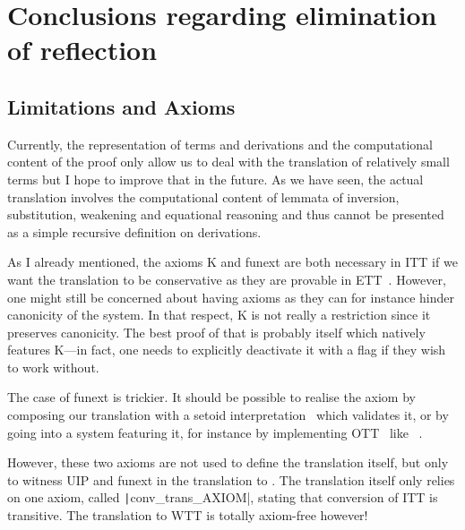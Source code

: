 \chapter{Conclusions regarding elimination of reflection}

\section{Limitations and Axioms}
\label{sec:axioms}

Currently, the representation of terms and derivations and the
computational content of the proof only allow us to deal with the
translation of relatively small terms but I hope to improve that in
the future. As we have seen, the actual translation involves the
computational content of lemmata of inversion, substitution, weakening
and equational reasoning and thus cannot be presented as a simple
recursive definition on derivations.


As I already mentioned, the axioms K and \acrshort{funext} are both
necessary in \acrshort{ITT} if we want the translation to be conservative as
they are provable in \acrshort{ETT}~.
However, one might still be concerned about having axioms
as they can for instance hinder canonicity of the system.
In that respect, K is not really a restriction since it preserves canonicity.
The best proof of that is probably \Agda itself which natively features K---in
fact, one needs to explicitly deactivate it with a flag if they wish to work
without.

The case of \acrshort{funext} is trickier. It should be possible to realise
the axiom by composing our translation with a setoid
interpretation~ which validates it, or by going into a
system featuring it, for instance by implementing
\acrlong{OTT}~ like
\Epigram~.

However, these two axioms are not used to define the translation itself,
but only to witness \acrshort{UIP} and \acrlong{funext} in the translation to
\Coq.
The translation itself only relies on one axiom, called
\texttt|conv_trans_AXIOM|, stating that conversion
of \acrshort{ITT} is transitive.
The translation to \acrshort{WTT} is totally axiom-free however!

